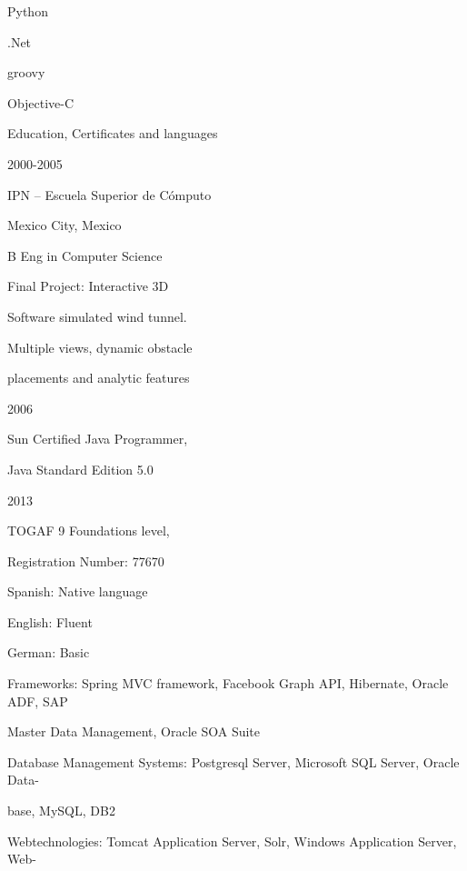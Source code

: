 \documentclass[
]{article}
\begin{document}
\protect\hypertarget{f2}{}{Python}

\protect\hypertarget{f3}{}{.Net}

\protect\hypertarget{f2}{}{groovy}

\protect\hypertarget{f3}{}{Objective-C}

\protect\hypertarget{f4}{}{Education, Certificates and languages}

\protect\hypertarget{f3}{}{2000-2005}

\protect\hypertarget{f3}{}{IPN -- Escuela Superior de Cómputo}

\protect\hypertarget{f3}{}{Mexico City, Mexico}

\protect\hypertarget{f3}{}{B Eng in Computer Science}

\protect\hypertarget{f3}{}{Final Project: Interactive 3D}

\protect\hypertarget{f3}{}{Software simulated wind tunnel.}

\protect\hypertarget{f3}{}{Multiple views, dynamic obstacle}

\protect\hypertarget{f3}{}{placements and analytic features}

\protect\hypertarget{f3}{}{2006}

\protect\hypertarget{f3}{}{Sun Certified Java Programmer,}

\protect\hypertarget{f3}{}{Java Standard Edition 5.0}

\protect\hypertarget{f3}{}{2013}

\protect\hypertarget{f3}{}{TOGAF 9 Foundations level,}

\protect\hypertarget{f3}{}{Registration Number: 77670}

\protect\hypertarget{f3}{}{Spanish: Native language}

\protect\hypertarget{f3}{}{English: Fluent}

\protect\hypertarget{f3}{}{German: Basic}

\protect\hypertarget{f1}{}{Frameworks:
}\protect\hypertarget{f2}{}{Spring MVC framework, Facebook Graph API,
Hibernate, Oracle ADF, SAP}

\protect\hypertarget{f2}{}{Master Data Management, Oracle SOA Suite}

\protect\hypertarget{f1}{}{Database Management Systems:
}\protect\hypertarget{f3}{}{Postgresql Server, Microsoft SQL Server,
Oracle Data}\protect\hypertarget{f2}{}{-}

\protect\hypertarget{f3}{}{base, MySQL, DB2}

\protect\hypertarget{f1}{}{Webtechnologies:
}\protect\hypertarget{f3}{}{Tomcat Application Server, Solr, Windows
Application Server, Web}\protect\hypertarget{f2}{}{-}
\end{document}
